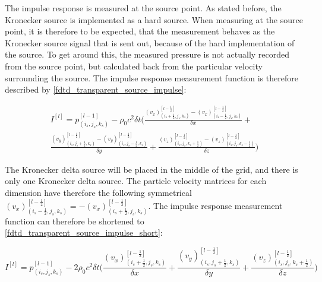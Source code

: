 The impulse response is measured at the source point. As stated before, the Kronecker source is implemented as a hard source. When measuring at the source point, it is therefore to be expected, that the measurement behaves as the Kronecker source signal that is sent out, because of the hard implementation of the source. To get around this, the measured pressure is not actually recorded from the source point, but calculated back from the particular velocity surrounding the source.
The impulse response measurement function is therefore described by \autoref{fdtd_transparent_source_impulse}:

\begin{multline}\label{fdtd_transparent_source_impulse}
I^{[l]}=p_{(i_{s},j_{s},k_{s})}^{[l-1]} - \rho_0 c^2 \delta t  \Biggl( \frac{(v_x)_{(i_{s}+\frac{1}{2},j_{s},k_{s})}^{[l-\frac{1}{2}]} - (v_x)_{(i_{s}-\frac{1}{2},j_{s},k_{s})}^{[l-\frac{1}{2}]}}{\delta x} +\\
 \frac{(v_y)_{(i_{s},j_{s}+\frac{1}{2},k_{s})}^{[l-\frac{1}{2}]}-(v_y)_{(i_{s},j_{s}-\frac{1}{2},k_{s})}^{[l-\frac{1}{2}]}}{\delta y} +  
 \frac{(v_z)_{(i_{s},j_{s},k_{s}+\frac{1}{2})}^{[l-\frac{1}{2}]}-(v_z)_{(i_{s},j_{s},k_{s}-\frac{1}{2})}^{[l-\frac{1}{2}]}}{\delta z} \Biggr)
\end{multline}


The Kronecker delta source will be placed in the middle of the grid, and there is only one Kronecker delta source. The particle velocity matrices for each dimension have therefore the following symmetrical $(v_x)_{(i_{s}-\frac{1}{2},j_{s},k_{s})}^{[l-\frac{1}{2}]} = -(v_x)_{(i_{s}+\frac{1}{2},j_{s},k_{s})}^{[l-\frac{1}{2}]}$. The impulse response measurement function can therefore be shortened to \autoref{fdtd_transparent_source_impulse_short}:

\begin{equation}\label{fdtd_transparent_source_impulse_short}
I^{[l]}=p_{(i_{s},j_{s},k_{s})}^{[l-1]} - 2\rho_0 c^2 \delta t  \Biggl( \frac{(v_x)_{(i_{s}+\frac{1}{2},j_{s},k_{s})}^{[l-\frac{1}{2}]}}{\delta x} +
 \frac{(v_y)_{(i_{s},j_{s}+\frac{1}{2},k_{s})}^{[l-\frac{1}{2}]}}{\delta y} +  
 \frac{(v_z)_{(i_{s},j_{s},k_{s}+\frac{1}{2})}^{[l-\frac{1}{2}]}}{\delta z} \Biggr)
\end{equation}


